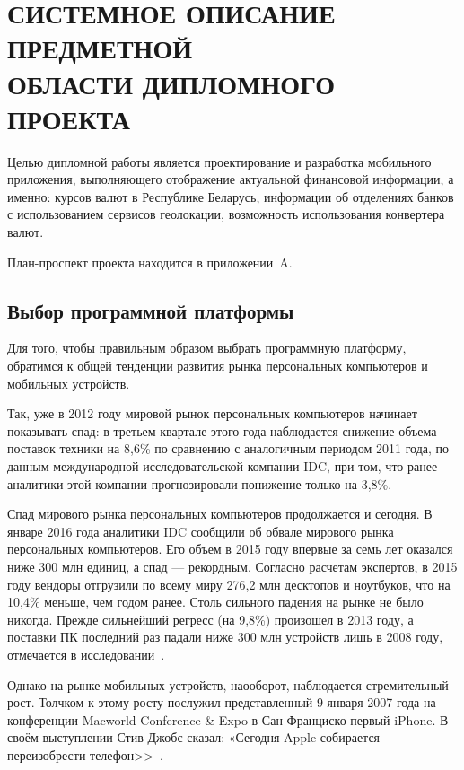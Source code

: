 \section[Системное описание предметной области дипломного проекта]{%
  СИСТЕМНОЕ ОПИСАНИЕ ПРЕДМЕТНОЙ \\
  ОБЛАСТИ ДИПЛОМНОГО ПРОЕКТА
}\label{sec:spec}

Целью дипломной работы является проектирование и
разработка мобильного приложения, выполняющего отображение актуальной
финансовой информации, а именно: курсов валют в Республике Беларусь,
информации об отделениях банков с использованием сервисов геолокации,
возможность использования конвертера валют.

План-проспект проекта находится в приложении~A.


\subsection{Выбор программной платформы}

Для того, чтобы правильным образом выбрать программную платформу, обратимся к
общей тенденции развития рынка персональных компьютеров и мобильных устройств.

Так, уже в 2012 году мировой рынок персональных компьютеров начинает показывать спад:
в третьем квартале этого года наблюдается снижение объема
поставок техники на 8,6\% по сравнению с аналогичным периодом
2011 года, по данным международной исследовательской компании IDC, при том,
что ранее аналитики этой компании прогнозировали понижение только на 3,8\%.

Спад мирового рынка персональных компьютеров продолжается и сегодня. В январе 2016
года аналитики IDC сообщили об обвале мирового рынка персональных компьютеров.
Его объем в 2015 году впервые за семь лет оказался ниже 300 млн единиц,
а спад --- рекордным. Согласно расчетам экспертов, в 2015 году вендоры отгрузили
по всему миру 276,2 млн десктопов и ноутбуков, что на 10,4\% меньше, чем годом ранее.
Столь сильного падения на рынке не было никогда.
Прежде сильнейший регресс (на 9,8\%) произошел в 2013 году, а поставки ПК последний
раз падали ниже 300 млн устройств лишь в 2008 году, отмечается в исследовании~\cite{computers_world_market}.

Однако на рынке мобильных устройств, наооборот, наблюдается стремительный рост.
Толчком к этому росту послужил представленный 9 января 2007 года на конференции
Macworld Conference \& Expo в Сан-Франциско первый iPhone. В своём выступлении
Стив Джобс сказал: «Сегодня Apple собирается переизобрести телефон>>~\cite{apple_reinvent_phone}.

